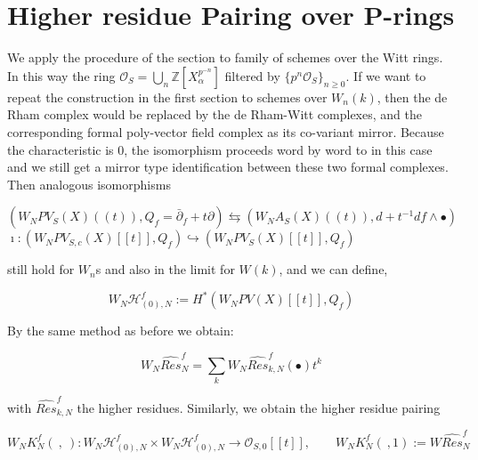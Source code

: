 \documentclass[12pt,twoside]{amsart}
\begin{document}
\vspace{0.5cm}

 
\section{Higher residue Pairing over P-rings}

\vspace{0.5cm}

We apply the procedure of the section to family of schemes over the Witt rings. In this way the ring $\mathcal{O}_S=\bigcup_n \mathbb{Z}[X_{\alpha}^{p^{-n}}]$ filtered by $\{p^n\mathcal{O}_S\}_{n \geq 0}$. If we want to repeat the construction in the first section to schemes over $W_n(k)$, then the de Rham complex would be replaced by the de Rham-Witt complexes, and the corresponding formal poly-vector field complex as its co-variant mirror. Because the characteristic is $0$, the isomorphism proceeds word by word to in this case and we still get a mirror type identification between these two formal complexes. Then analogous isomorphisms 

\vspace{0.5cm}

\begin{center}
$(W_NPV_{S}(X)((t)), Q_f=\bar{\partial}_f+t\partial) \leftrightarrows (W_NA_{S}(X)((t)), d+t^{-1}df \wedge \bullet)$\\[0.6cm]
$\imath:(W_NPV_{S,c}(X)[[t]], Q_f) \hookrightarrow (W_NPV_{S}(X)[[t]], Q_f)$ 
\end{center}

\vspace{0.5cm}

\noindent
still hold for $W_n$s and also in the limit for $W(k)$, and we can define,

\[ W_N\mathcal{H}_{(0),N}^f:=H^*(W_NPV(X)[[t]], Q_f) \]

\vspace{0.5cm}

\noindent
By the same method as before we obtain: 

\[ W_N\widehat{Res}_N^f=\sum_k W_N\widehat{Res}_{k,N}^f(\bullet)t^k \]

\vspace{0.5cm}

\noindent
with $\widehat{Res}_{k,N}^f$ the higher residues. Similarly, we obtain the higher residue pairing 

\[ W_NK_N^f( \ , \ ):W_N\mathcal{H}_{(0),N}^f \times W_N\mathcal{H}_{(0),N}^f \to \mathcal{O}_{S,0}[[t]], \qquad  W_NK_N^f( \ , 1 ):=W\widehat{Res}_N^f \]
\end{document}
